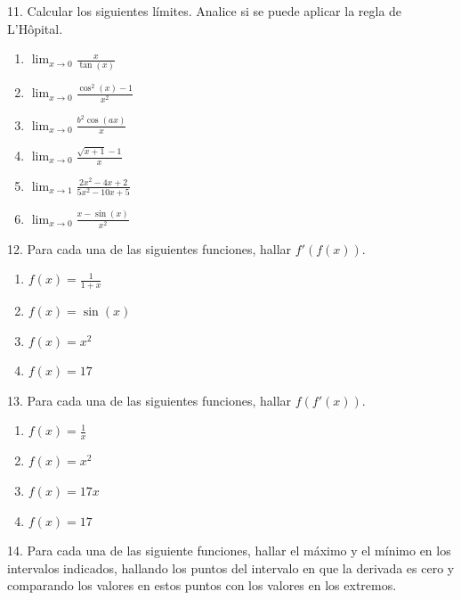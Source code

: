 \documentclass[12pt]{article}
\begin{document}
11. Calcular los siguientes l\'imites. Analice si se puede aplicar la regla de L'H\^opital.

\begin{enumerate}[\hspace{9px} a)]
    \item \(\displaystyle\lim_{x \to 0}\frac{x}{\tan(x)}\)
    \item \(\displaystyle\lim_{x \to 0}\frac{\cos^2(x)-1}{x^2}\)
    \item \(\displaystyle\lim_{x \to 0}\frac{b^2\cos(ax)}{x}\)
    \item \(\displaystyle\lim_{x \to 0}\frac{\sqrt{x+1}-1}{x}\)
    \item \(\displaystyle\lim_{x \to 1}\frac{2x^2-4x+2}{5x^2-10x+5}\)
    \item \(\displaystyle\lim_{x \to 0}\frac{x-\sin(x)}{x^2}\)
\end{enumerate}

12. Para cada una de las siguientes funciones, hallar $f'(f(x))$.

\begin{enumerate}[\hspace{9px} a)]
    \item \(f(x)=\displaystyle\frac{1}{1+x}\)
    \item \(f(x)=\sin(x)\)
    \item \(f(x)=x^2\)
    \item \(f(x)=17\)
\end{enumerate}

13. Para cada una de las siguientes funciones, hallar $f(f'(x))$.

\begin{enumerate}[\hspace{9px} a)]
    \item \(f(x)=\displaystyle\frac{1}{x}\)
    \item \(f(x)=x^2\)
    \item \(f(x)=17x\)
    \item \(f(x)=17\)
\end{enumerate}

14. Para cada una de las siguiente funciones, hallar el m\'aximo y el m\'inimo en los intervalos indicados, hallando los puntos del intervalo en que la derivada es cero y comparando los valores en estos puntos con los valores en los extremos.
\end{document}

